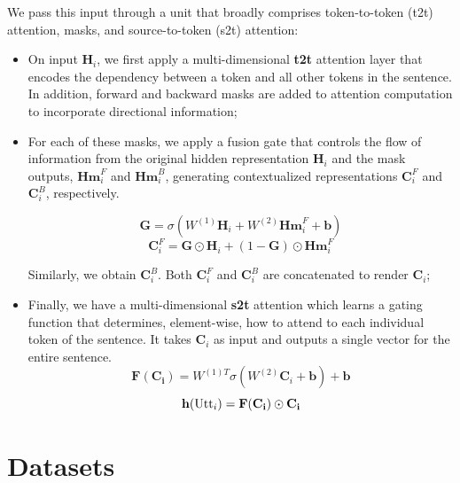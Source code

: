 We pass this input through a  unit that broadly comprises  token-to-token (t2t) attention, masks, and source-to-token (s2t) attention:
\begin{itemize}
\item On input $\mathbf{H}_i$, we first apply a multi-dimensional \textbf{t2t} attention layer that encodes the dependency between a token and all other tokens in the sentence. In addition, forward and backward masks are added to attention computation to incorporate directional information;
\item For each of these masks, we apply a fusion gate that controls the flow of information from the original hidden representation $\mathbf{H}_i$ and the mask outputs, $\mathbf{Hm}_i^F$ and $\mathbf{Hm}_i^B$, generating contextualized representations $\mathbf{C}_i^F$ and $\mathbf{C}_i^B$, respectively.

$$\mathbf{G} = \sigma(W^{(1)}\mathbf{H}_i + W^{(2)}\mathbf{Hm}_i^F + \mathbf{b})$$
$$\mathbf{C}_i^F = \mathbf{G} \odot \mathbf{H}_i + (1 - \mathbf{G}) \odot \mathbf{Hm}_i^F$$

Similarly, we obtain $\mathbf{C}_i^B$. Both $\mathbf{C}_i^F$ and $\mathbf{C}_i^B$ are concatenated to render $\mathbf{C}_i$;
\item Finally, we have a multi-dimensional \textbf{s2t} attention which learns a gating function that determines, element-wise, how to attend to each individual token of the sentence. It takes $\mathbf{C}_i$ as input and outputs a single vector for the entire sentence.
$$\mathbf{F(C_i)} = W^{(1)T}\sigma(W^{(2)}\mathbf{C}_i + \mathbf{b}) + \mathbf{b}$$
$$\mathbf{h}({\text{Utt}_i}) = \mathbf{F(C_i)} \odot \mathbf{C_i}$$


\end{itemize}


\section{Datasets}

